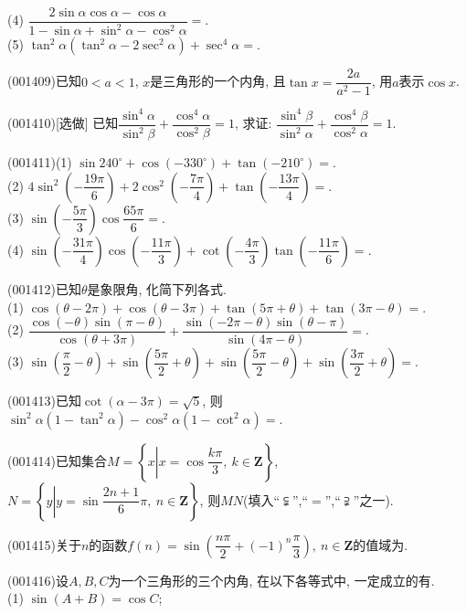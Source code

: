 (4) $\dfrac{2\sin\alpha\cos\alpha-\cos\alpha}{1-\sin\alpha+\sin^2\alpha-\cos^2\alpha}=$.\\ 
(5) $\tan^2\alpha(\tan^2\alpha-2\sec^2\alpha)+\sec^4\alpha=$.
\item (001409)已知$0<a<1$, $x$是三角形的一个内角, 且$\tan x=\dfrac{2a}{a^2-1}$, 用$a$表示$\cos x$.
\item (001410)[选做]
已知$\dfrac{\sin^4\alpha}{\sin^2\beta}+\dfrac{\cos^4\alpha}{\cos^2\beta}=1$, 求证: $\dfrac{\sin^4\beta}{\sin^2\alpha}+\dfrac{\cos^4\beta}{\cos^2\alpha}=1$.
\item (001411)(1) $\sin 240^\circ+\cos(-330^\circ)+\tan(-210^\circ)=$.\\ 
(2) $4\sin^2\left(-\dfrac{19\pi}{6}\right)+2\cos^2\left(-\dfrac{7\pi}{4}\right)+\tan\left(-\dfrac{13\pi}{4}\right)=$.\\ 
(3) $\sin\left(-\dfrac{5\pi}{3}\right)\cos\dfrac{65\pi}{6}=$.\\ 
(4) $\sin\left(-\dfrac{31\pi}{4}\right)\cos\left(-\dfrac{11\pi}{3}\right)+\cot\left(-\dfrac{4\pi}{3}\right)\tan\left(-\dfrac{11\pi}{6}\right)=$.
\item (001412)已知$\theta$是象限角, 化简下列各式.\\ 
(1) $\cos(\theta-2\pi)+\cos(\theta-3\pi)+\tan(5\pi+\theta)+\tan(3\pi-\theta)=$.\\ 
(2) $\dfrac{\cos(-\theta)\sin(\pi-\theta)}{\cos(\theta+3\pi)}+\dfrac{\sin(-2\pi-\theta)\sin(\theta-\pi)}{\sin(4\pi-\theta)}=$.\\ 
(3) $\sin\left(\dfrac{\pi}{2}-\theta\right)+\sin\left(\dfrac{5\pi}{2}+\theta\right)
+\sin\left(\dfrac{5\pi}{2}-\theta\right)+\sin\left(\dfrac{3\pi}{2}+\theta\right)=$.
\item (001413)已知$\cot(\alpha-3\pi)=\sqrt{5}$, 则$\sin^2\alpha(1-\tan^2\alpha)-\cos^2\alpha(1-\cot^2\alpha)=$.
\item (001414)已知集合$M=\left\{x\left|x=\cos\dfrac{k\pi}{3}, \ k \in \mathbf{Z}\right.\right\}$, $N=\left\{y\left|y=\sin\dfrac{2n+1}{6}\pi,\ n \in \mathbf{Z}\right.\right\}$, 则$M$$N$(填入``$\subsetneqq$'',``$=$'',``$\supsetneqq$''之一).
\item (001415)关于$n$的函数$f(n)=\sin\left(\dfrac{n\pi}{2}+(-1)^n\dfrac{\pi}{3}\right),\ n \in \mathbf{Z}$的值域为.
\item (001416)设$A,B,C$为一个三角形的三个内角, 在以下各等式中, 一定成立的有.\\ 
(1) $\sin(A+B)=\cos C$;\\ 

